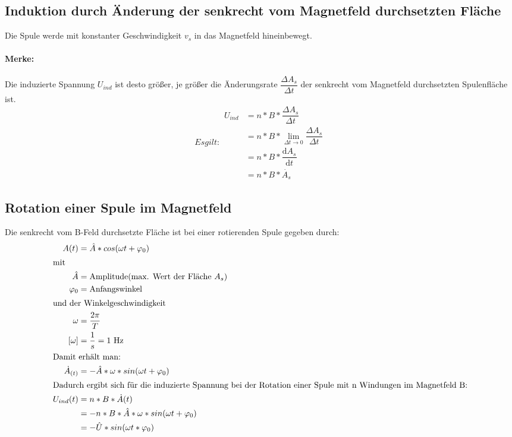 \documentclass[12 pt]{article}
\numberwithin{equation}{section}
\begin{document}
	\subsection{Induktion durch Änderung der senkrecht vom Magnetfeld durchsetzten Fläche}
	Die Spule werde mit konstanter Geschwindigkeit $v_s$ in das Magnetfeld hineinbewegt.
	\paragraph{Merke:} Die induzierte Spannung $U_{ind}$ ist desto größer, je größer die Änderungsrate $\dfrac{\Delta A_s}{\Delta t}$ der senkrecht vom Magnetfeld durchsetzten Spulenfläche ist.
	\begin{subequations}
		Es gilt:
		\begin{align}
		U_{ind}&=n*B*\dfrac{\Delta A_s}{\Delta t}\nonumber\\
		&=n*B*\lim\limits_{\Delta t\rightarrow 0}  \dfrac{\Delta A_s}{\Delta t}\nonumber\\
		&=n*B*\dfrac{\mathrm{d} A_s}{\mathrm{d} t}\nonumber\\
		&=n*B*\dot{A_s}
		\end{align}
	\end{subequations}
	\subsection{Rotation einer Spule im Magnetfeld}
	Die senkrecht vom B-Feld durchsetzte Fläche ist bei einer rotierenden Spule gegeben durch:
		\begin{align}
		A(t)&=\hat{A}*cos(\omega t+\varphi_{0})\\
		\intertext{mit}
		\hat{A}&=\text{Amplitude(max. Wert der Fläche $A_s$)}\nonumber\\
		\varphi_{0}&=\text{Anfangswinkel}\nonumber\\
		\intertext{und der Winkelgeschwindigkeit}
		\omega&=\dfrac{2\pi}{T}\nonumber\\
		[\omega]&=\dfrac{1}{s}=1\text{ Hz}\nonumber\\
		\intertext{Damit erhält man:}
		\dot{A}_{(t)}&=-\hat{A}*\omega*sin(\omega t+\varphi_{0})\nonumber\\
		\intertext{Dadurch ergibt sich für die induzierte Spannung bei der Rotation einer Spule mit n Windungen im Magnetfeld B:}
		U_{ind}(t)&=n*B*\dot{A}(t)\nonumber\\
		&=-n*B*\hat{A}*\omega*sin(\omega t+\varphi_{0})\nonumber\\
		&=-\hat{U}*sin(\omega t*\varphi_{0})		
		\end{align}
\end{document}
